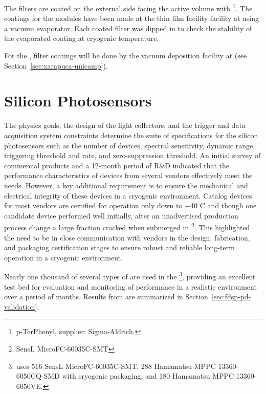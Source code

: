 The filters are coated on the external side facing the  active volume with \footnote{p-TerPhenyl, supplier: Sigma-Aldrich\textregistered.}.  The coatings for the  modules have been made at the thin film facility facility at  using a vacuum evaporator. Each coated filter was dipped in  to check the stability of the evaporated coating at cryogenic temperature. 

For the , filter coatings will be done by the vacuum deposition facility at  (see Section~\ref{sec:xarapuca-unicamp}).

\section{Silicon Photosensors} %
\label{sec:fdsp-pd-ps}

The physics goals, the design of the light collectors, and the trigger and data acquisition system constraints determine the suite of specifications for the silicon photosensors such as the number of devices, spectral sensitivity, dynamic range, triggering threshold and rate, and zero-suppression threshold. An initial survey of commercial products and a 12-month period of R\&D indicated that the performance characteristics of devices from several vendors effectively meet the  needs. 
However, a key additional requirement is to ensure the mechanical and electrical integrity of these devices in a cryogenic environment. Catalog devices for most vendors are certified for operation only down to \num{-40}$^\circ$C and though one candidate device performed well initially, after an unadvertised production process change a large fraction cracked when submerged in \footnote{SensL MicroFC-60035C-SMT}. This highlighted the need to be in close communication with vendors in the 
 design, fabrication, and packaging certification stages to ensure 
robust and reliable long-term operation in a cryogenic environment. 

Nearly one thousand of several types of  are used in the  \footnote{  uses 516 SensL MicroFC-60035C-SMT, 288 Hamamatsu MPPC 13360-6050CQ-SMD with cryogenic packaging, and 180 Hamamatsu MPPC 13360-6050VE.}, providing an excellent test bed for evaluation and monitoring of  performance in a realistic environment over a period of months. Results from  are summarized in Section~\ref{sec:fdsp-pd-validation}.

